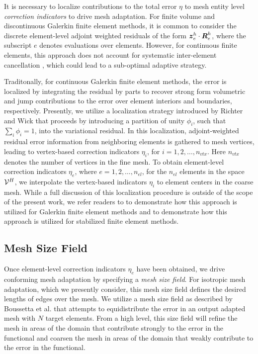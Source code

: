 It is necessary to localize contributions to the 
total error $\eta$ to mesh entity level \emph{correction indicators}
to drive mesh adaptation. For finite volume and discontinuous
Galerkin finite element methods, it is common to consider the discrete
element-level adjoint weighted residuals of the form
$\boldsymbol{z}^h_e \cdot \boldsymbol{R}^h_e$, where the subscript $e$ denotes evaluations
over elements. However, for continuous finite elements, this approach
does not account for systematic inter-element cancellation
\cite{fidkowski2011review}, which could lead to a sub-optimal adaptive
strategy.

Traditonally, for continuous Galerkin finite element methods, the
error is localized by integrating the residual by parts to recover
strong form volumetric and jump contributions to the error over
element interiors and boundaries, respectively. Presently, we utilize
a localization strategy introduced by Richter and Wick
\cite{richter2015variational} that proceeds by introducing a
partition of unity $\phi_i$, such that $\sum_i \phi_i = 1$, into the
variational residual. In this localization, adjoint-weighted residual
error information from neighboring elements is gathered to mesh
vertices, leading to vertex-based correction indicators $\eta_i$,
for $i = 1, 2, \dots, n_{vtx}$. Here $n_{vtx}$ denotes the number
of vertices in the fine mesh. To obtain element-level correction
indicators $\eta_e$, where $e = 1,2, \dots, n_{el}$, for the $n_{el}$
elements in the space $\mathcal{V}^H$, we interpolate the vertex-based
indicators $\eta_i$ to element centers in the coarse mesh.
While a full discussion of this localization procedure is outside
of the scope of the present work, we refer readers to
\cite{richter2015variational, wick2016goal} to demonstrate how this
approach is utilized for Galerkin finite element methods and
\cite{granzow2017adjoint} to demonstrate how this approach is
utilized for stabilized finite element methods.

\subsection{Mesh Size Field}

Once element-level correction indicators $\eta_e$ have been obtained, we
drive conforming mesh adaptation by specifying a \emph{mesh size field}.
For isotropic mesh adaptation, which we presently consider, this mesh size
field defines the desired lengths of edges over the mesh. We utilize a mesh
size field as described by Boussetta et al. \cite{boussetta2006adaptive}
that attempts to equidistribute the error in an output adapted mesh with
$N$ target elements. From a high level, this size field will refine the mesh
in areas of the domain that contribute strongly to the error in the functional
and coarsen the mesh in areas of the domain that weakly contribute to the
error in the functional.

